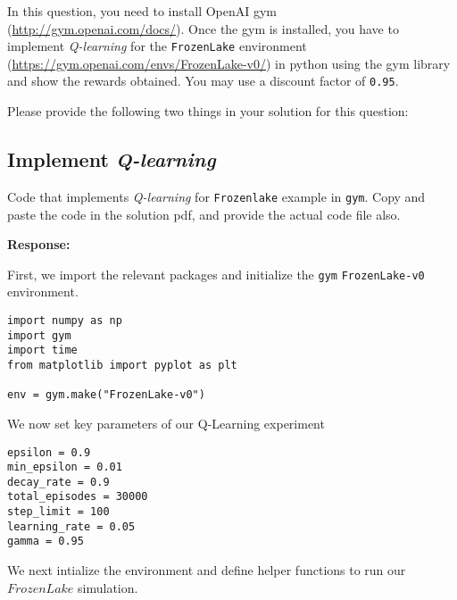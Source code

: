 \documentclass[12pt, letterpaper]{article}
\newcommand{\mybox}[1]{\par\noindent\colorbox{shadecolor}
{\parbox{\dimexpr\textwidth-2\fboxsep\relax}{#1}}}
\begin{document}
\mybox{In this question, you need to install OpenAI gym (\href{http://gym.openai.com/docs/}{http://gym.openai.com/docs/}). 
Once the gym is installed, you have to implement \textit{Q-learning} for the \texttt{FrozenLake} environment (\href{https://gym.openai.com/envs/FrozenLake-v0/}{https://gym.openai.com/envs/FrozenLake-v0/}) in python using the gym library and show the rewards obtained. 
You may use a discount factor of \texttt{0.95}.

Please provide the following two things in your solution for this question:}

\subsection{Implement \textit{Q-learning}}
\mybox{Code that implements \textit{Q-learning} for \texttt{Frozenlake} example in \texttt{gym}. 
Copy and paste the code in the solution pdf, and provide the actual code file also.}

\textbf{Response:}

First, we import the relevant packages and initialize the \texttt{gym} \texttt{FrozenLake-v0} environment.

\begin{mdframed}[backgroundcolor=shadecolor]
\begin{verbatim}
import numpy as np
import gym
import time
from matplotlib import pyplot as plt

env = gym.make("FrozenLake-v0")
\end{verbatim}
\end{mdframed}

We now set key parameters of our Q-Learning experiment

\begin{mdframed}[backgroundcolor=shadecolor]
\begin{verbatim}
epsilon = 0.9
min_epsilon = 0.01
decay_rate = 0.9
total_episodes = 30000
step_limit = 100
learning_rate = 0.05
gamma = 0.95
\end{verbatim}
\end{mdframed}

We next intialize the environment and define helper functions to run our $FrozenLake$ simulation.
\end{document}
